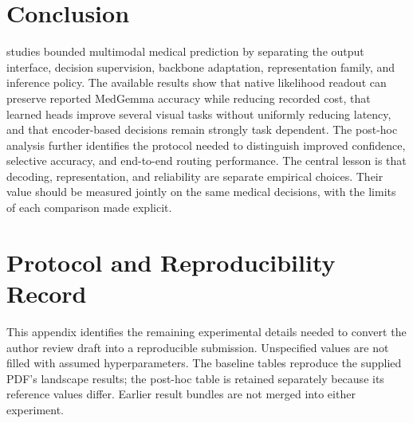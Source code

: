 \section{Conclusion}

\sysone studies bounded multimodal medical prediction by separating the output interface, decision supervision, backbone adaptation, representation family, and inference policy. The available results show that native likelihood readout can preserve reported MedGemma accuracy while reducing recorded cost, that learned heads improve several visual tasks without uniformly reducing latency, and that encoder-based decisions remain strongly task dependent. The post-hoc analysis further identifies the protocol needed to distinguish improved confidence, selective accuracy, and end-to-end routing performance. The central lesson is that decoding, representation, and reliability are separate empirical choices. Their value should be measured jointly on the same medical decisions, with the limits of each comparison made explicit.

\appendix
\section{Protocol and Reproducibility Record}
\label{app:protocol}

This appendix identifies the remaining experimental details needed to convert the author review draft into a reproducible submission. Unspecified values are not filled with assumed hyperparameters. The baseline tables reproduce the supplied PDF's landscape results; the post-hoc table is retained separately because its reference values differ. Earlier result bundles are not merged into either experiment.

